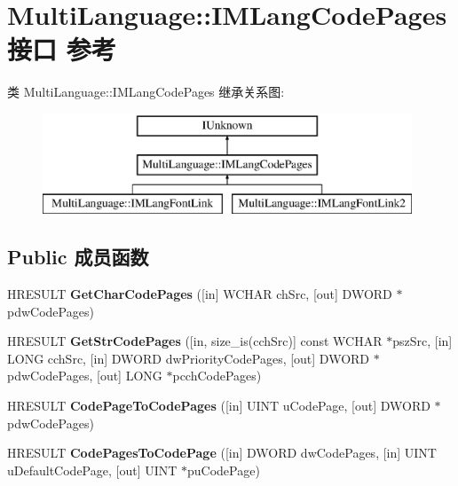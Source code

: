 \hypertarget{interface_multi_language_1_1_i_m_lang_code_pages}{}\section{Multi\+Language\+:\+:I\+M\+Lang\+Code\+Pages接口 参考}
\label{interface_multi_language_1_1_i_m_lang_code_pages}
类 Multi\+Language\+:\+:I\+M\+Lang\+Code\+Pages 继承关系图\+:\begin{figure}[H]
\begin{center}
\leavevmode
\includegraphics[height=3.000000cm]{interface_multi_language_1_1_i_m_lang_code_pages}
\end{center}
\end{figure}
\subsection*{Public 成员函数}
\begin{DoxyCompactItemize}
\item 
\mbox{\label{interface_multi_language_1_1_i_m_lang_code_pages_add33cf54aa57290a604e47759ffec8d7}} 
H\+R\+E\+S\+U\+LT {\bfseries Get\+Char\+Code\+Pages} (\mbox{[}in\mbox{]} W\+C\+H\+AR ch\+Src, \mbox{[}out\mbox{]} D\+W\+O\+RD $\ast$pdw\+Code\+Pages)
\item 
\mbox{\label{interface_multi_language_1_1_i_m_lang_code_pages_a759f71006e31ae1a50d13e9659886d48}} 
H\+R\+E\+S\+U\+LT {\bfseries Get\+Str\+Code\+Pages} (\mbox{[}in, size\+\_\+is(cch\+Src)\mbox{]} const W\+C\+H\+AR $\ast$psz\+Src, \mbox{[}in\mbox{]} L\+O\+NG cch\+Src, \mbox{[}in\mbox{]} D\+W\+O\+RD dw\+Priority\+Code\+Pages, \mbox{[}out\mbox{]} D\+W\+O\+RD $\ast$pdw\+Code\+Pages, \mbox{[}out\mbox{]} L\+O\+NG $\ast$pcch\+Code\+Pages)
\item 
\mbox{\label{interface_multi_language_1_1_i_m_lang_code_pages_ae04d79631127aa21b275b4e3267700f5}} 
H\+R\+E\+S\+U\+LT {\bfseries Code\+Page\+To\+Code\+Pages} (\mbox{[}in\mbox{]} U\+I\+NT u\+Code\+Page, \mbox{[}out\mbox{]} D\+W\+O\+RD $\ast$pdw\+Code\+Pages)
\item 
\mbox{\label{interface_multi_language_1_1_i_m_lang_code_pages_ad060954eaaeef6f34dc48e86c2663c85}} 
H\+R\+E\+S\+U\+LT {\bfseries Code\+Pages\+To\+Code\+Page} (\mbox{[}in\mbox{]} D\+W\+O\+RD dw\+Code\+Pages, \mbox{[}in\mbox{]} U\+I\+NT u\+Default\+Code\+Page, \mbox{[}out\mbox{]} U\+I\+NT $\ast$pu\+Code\+Page)
\end{DoxyCompactItemize}
